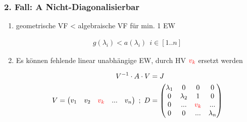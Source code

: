 \documentclass[10pt,a4paper]{article}
\begin{document}
\subsubsection{2. Fall: A Nicht-Diagonalisierbar}
\begin{enumerate}[{(1)}]
    \item geometrische VF < algebraische VF für min. 1 EW
  \begin{mdframed}[style=exercise]
    \begin{align}
        g(\lambda_i) < a(\lambda_i) \ \ i \in [1..n]
    \end{align}
  \end{mdframed}
    \item Es können fehlende linear unabhängige EW, durch HV $\textcolor{red}{v_k}$ ersetzt werden
  \begin{mdframed}[style=exercise]
    \begin{align}
        V^{-1} \cdot A \cdot V &= J \\
        V =
        \begin{pmatrix}
            v_1 & v_2 & \textcolor{red}{v_k} &... & v_n
        \end{pmatrix}\ ;\ 
        D &=
        \begin{pmatrix}
             \lambda_1& 0  & 0& 0 \\
             0 & \lambda_2 & 1 & 0 \\
             0 & ...       & \textcolor{red}{v_k} & ... \\
             0 & 0 & ... & \lambda_n \\
        \end{pmatrix} 
    \end{align}
  \end{mdframed}
\end{enumerate}
\end{document}
